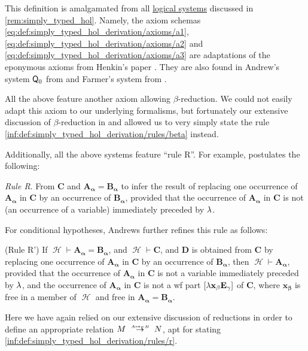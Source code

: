 \begin{comments}
  \item This definition is amalgamated from all \hyperref[con:logical_system]{logical systems} discussed in \cref{rem:simply_typed_hol}. Namely, the axiom schemas \eqref{eq:def:simply_typed_hol_derivation/axioms/a1}, \eqref{eq:def:simply_typed_hol_derivation/axioms/a2} and \eqref{eq:def:simply_typed_hol_derivation/axioms/a3} are adaptations of the eponymous axioms from Henkin's paper \cite[37]{Henkin1975Identity}. They are also found in Andrew's system \( \textsf{Q}_0 \) from \cite[\S 51]{Andrews2002Logic} and Farmer's system from \cite[278]{Farmer2008STTVirtues}.

  All the above feature another axiom allowing \( \beta \)-reduction. We could not easily adapt this axiom to our underlying formalisms, but fortunately our extensive discussion of \( \beta \)-reduction in  and  allowed us to very simply state the rule \ref{inf:def:simply_typed_hol_derivation/rules/beta} instead.

  Additionally, all the above systems feature \enquote{rule R}. For example,  postulates the following:
  \begin{displayquote}
    \textit{Rule R}. From \( \mathbf{C} \) and \( \mathbf{A_\alpha} = \mathbf{B_\alpha} \) to infer the result of replacing one occurrence of \( \mathbf{A_\alpha} \) in \( \mathbf{C} \) by an occurrence of \( \mathbf{B_\alpha} \), provided that the occurrence of \( \mathbf{A_\alpha} \) in \( \mathbf{C} \) is not (an occurrence of a variable) immediately preceded by \( {\mathrm \lambda} \).
  \end{displayquote}

  For conditional hypotheses, Andrews further refines this rule as follows:
  \begin{displayquote}
    (Rule R') If \( \mscrH \vdash \mathbf{A_\alpha} = \mathbf{B_\alpha} \), and \( \mscrH \vdash \mathbf{C} \), and \( \mathbf{D} \) is obtained from \( \mathbf{C} \) by replacing one occurrence of \( \mathbf{A_\alpha} \) in \( \mathbf{C} \) by an occurrence of \( \mathbf{B_\alpha} \), then \( \mscrH \vdash \mathbf{A_\alpha} \), provided that the occurrence of \( \mathbf{A_\alpha} \) in \( \mathbf{C} \) is not a variable immediately preceded by \( \mathbf{{\mathrm \lambda}} \), and the occurrence of \( \mathbf{A_\alpha} \) in \( \mathbf{C} \) is not a wf part \( [\mathbf{{\mathrm \lambda} x_\beta E_\gamma}] \) of \( \mathbf{C} \), where \( \mathbf{x_\beta} \) is free in a member of \( \mscrH \) and free in \( \mathbf{A_\alpha} = \mathbf{B_\alpha} \).
  \end{displayquote}

  Here we have again relied on our extensive discussion of reductions in order to define an appropriate relation \( M \redrel{A \mapsto_\Gamma B} N \), apt for stating \ref{inf:def:simply_typed_hol_derivation/rules/r}.
\end{comments}

\begin{definition}\label{def:nth_order_logic}
\end{definition}

\begin{definition}\label{def:simply_typed_definitional_extension}\mimprovised
\end{definition}
